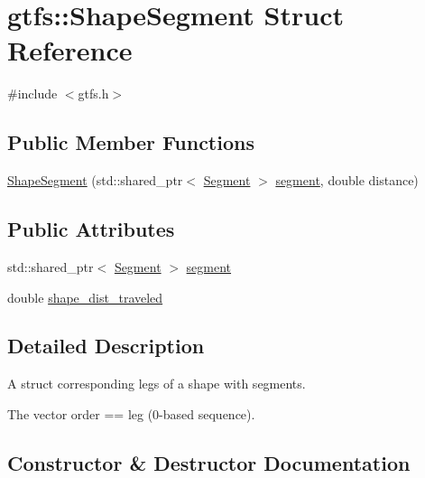 \hypertarget{structgtfs_1_1ShapeSegment}{}\section{gtfs\+:\+:Shape\+Segment Struct Reference}
\label{structgtfs_1_1ShapeSegment}


{\ttfamily \#include $<$gtfs.\+h$>$}

\subsection*{Public Member Functions}
\begin{DoxyCompactItemize}
\item 
\hyperlink{structgtfs_1_1ShapeSegment_af1bdb1504d16a49ab6ac8ea34da59c5f}{Shape\+Segment} (std\+::shared\+\_\+ptr$<$ \hyperlink{classgtfs_1_1Segment}{Segment} $>$ \hyperlink{structgtfs_1_1ShapeSegment_a3253b76a15e2645f894a75be55006e09}{segment}, double distance)
\end{DoxyCompactItemize}
\subsection*{Public Attributes}
\begin{DoxyCompactItemize}
\item 
std\+::shared\+\_\+ptr$<$ \hyperlink{classgtfs_1_1Segment}{Segment} $>$ \hyperlink{structgtfs_1_1ShapeSegment_a3253b76a15e2645f894a75be55006e09}{segment}
\item 
double \hyperlink{structgtfs_1_1ShapeSegment_a64afdd03235b9bc256fc18652c6f9c47}{shape\+\_\+dist\+\_\+traveled}
\end{DoxyCompactItemize}


\subsection{Detailed Description}
A struct corresponding legs of a shape with segments.

The vector order == leg (0-\/based sequence). 

\subsection{Constructor \& Destructor Documentation}
